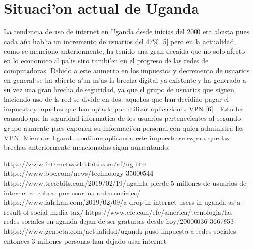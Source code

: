 \documentclass{article}
\begin{document}
	\section{Situaci'on actual de Uganda}
		\large{
			La tendencia de uso de internet en Uganda desde inicios del 2000 era alcista pues cada año hab'ia un incremento de usuarios del $47\%$ [5] pero en la actualidad, como se menciono anteriormente, ha tenido una gran decaida que no solo afecto en lo economico al pa'is sino tambi'en en el progreso de las redes de computadoras. Debido a este aumento en los impuestos y decremento de usuarios en general se ha abierto a'un m'as la brecha digital ya existente y ha generado a su vez una gran brecha de seguridad, ya que el grupo de usuarios que siguen haciendo uso de la red se divide en dos: aquellos que han decidido pagar el impuesto y aquellos que han optado por utilizar aplicaciones VPN [6] . Esto ha causado que la seguridad informatica de los usuarios pertenecientes al segundo grupo aumente pues exponen su informaci'on personal con quien administra las VPN. Mientras Uganda continue aplicando este impuesto se espera que las brechas anteriormente mencionadas sigan aumentando.
		}
	\begin{thebibliography}{00}
		 https://www.internetworldstats.com/af/ug.htm  
		 https://www.bbc.com/news/technology-35000544 
		 https://www.trecebits.com/2019/02/19/uganda-pierde-5-millones-de-usuarios-de-internet-al-cobrar-por-usar-las-redes-sociales/
		 https://www.iafrikan.com/2019/02/09/a-drop-in-internet-users-in-uganda-as-a-result-of-social-media-tax/
		 https://www.efe.com/efe/america/tecnologia/las-redes-sociales-en-uganda-dejan-de-ser-gratuitas-desde-hoy/20000036-3667953
		 https://www.genbeta.com/actualidad/uganda-puso-impuesto-a-redes-sociales-entonces-3-millones-personas-han-dejado-usar-internet
	\end{thebibliography}
\end{document}

